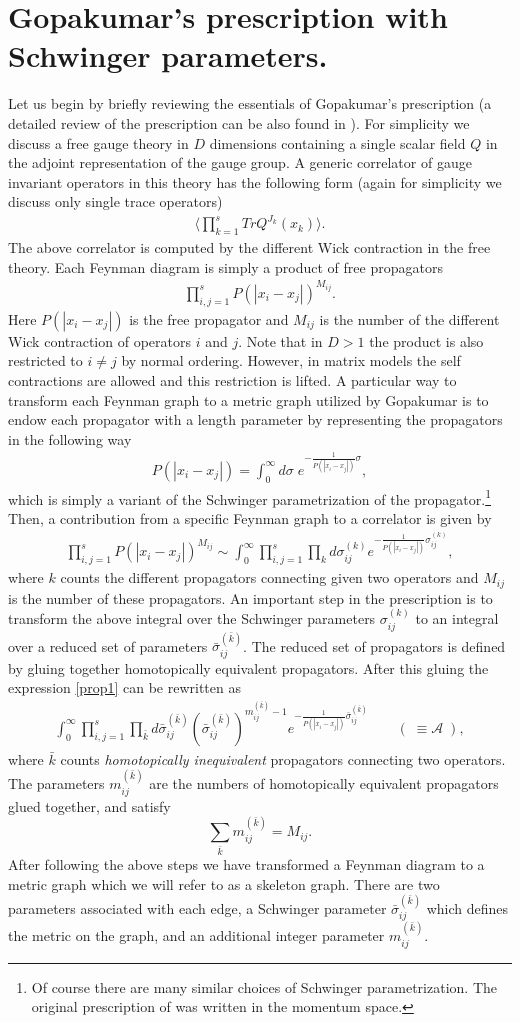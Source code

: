 \documentclass[11pt]{JHEP3}
\def\be{\begin{eqnarray}}
\def\ee{\end{eqnarray}}
\def\s{\sigma}
\def\s{\sigma}
\begin{document}
\section{Gopakumar's prescription with Schwinger parameters.}\label{gop}
Let us begin by briefly reviewing the essentials of Gopakumar's prescription \cite{Gopakumar3}
 (a detailed review of the prescription can be also found in \cite{Aharony:2006th}).
For simplicity we discuss a free gauge theory in $D$ dimensions containing a single scalar field $Q$ in
the adjoint representation of the gauge group. A generic
correlator of gauge invariant operators in this theory has the following form (again for simplicity
we discuss only single trace operators)
\be
\langle\prod_{k=1}^s TrQ^{J_k}(x_k)\rangle .
\ee The above correlator is computed by the different Wick contraction in the free theory.
Each Feynman diagram is simply a product of free propagators 
\be
\prod_{i, j=1}^s P(|x_i-x_j|)^{M_{ij}}.
\ee Here $P(|x_i-x_j|)$ is the free propagator and $M_{ij}$ is the number of the different Wick contraction of operators $i$ and $j$. 
Note that in $D>1$ the product is also restricted to $i\neq j$ by normal ordering. However,
in matrix models  the self contractions are allowed and this restriction is 
lifted. A particular way to transform each Feynman graph to a metric graph utilized by Gopakumar
 \cite{Gopakumar3} is to endow each propagator with a length parameter by representing the propagators in the following way
\be
P(|x_i-x_j|)=\int_0^\infty d\s\;e^{-\frac{1}{P(|x_i-x_j|)}\s},
\ee which is simply a variant of the Schwinger parametrization of the propagator.\footnote{Of course there are many similar choices of Schwinger parametrization. The original 
prescription of \cite{Gopakumar3} was written in the momentum space.} Then, a contribution from a specific Feynman graph  to a correlator is given by
\be\label{prop1}
\prod_{i, j=1}^s P(|x_i-x_j|)^{M_{ij}}\sim \int_0^\infty \prod_{i,j=1}^s\prod_k d \s_{ij}^{(k)}
 e^{-\frac{1}{P(|x_i-x_j|)}\s_{ij}^{(k)}},
\ee where $k$ counts the different propagators connecting given two operators and $M_{ij}$ is the
number of these propagators. An important step
in the prescription is to transform the above integral over the Schwinger parameters $\s_{ij}^{(k)}$ to
an integral over a reduced set of parameters  $\bar\s_{ij}^{(\bar k)}$. The reduced set of propagators is defined by gluing together homotopically equivalent propagators. After this
gluing the expression \eqref{prop1} can be rewritten as 
\be\label{prop2}
\int_0^\infty \prod_{i,j=1}^s\prod_{\bar k} d\bar \s_{ij}^{(\bar k)}
\left(\bar  \s_{ij}^{(\bar k)} \right)^{m_{ij}^{(\bar k)}-1}
 e^{-\frac{1}{P(|x_i-x_j|)}\bar \s_{ij}^{(\bar k)}}\qquad(\;\equiv{\mathcal A}\;),
\ee where $\bar k$ counts \textit{homotopically inequivalent} propagators connecting two operators.
The parameters $m_{ij}^{(\bar k)}$ are the numbers of homotopically equivalent propagators glued together, and satisfy $$\sum_{\bar k}m_{ij}^{(\bar k)}=M_{ij}.$$ After following the above steps
we have transformed a Feynman diagram to a metric graph which we will refer to as a skeleton graph. There are two parameters associated with
each edge, a Schwinger parameter $\bar \s_{ij}^{(\bar k)}$ which defines the metric on the graph, and an additional integer parameter $m_{ij}^{(\bar k)}$.  
\end{document}
